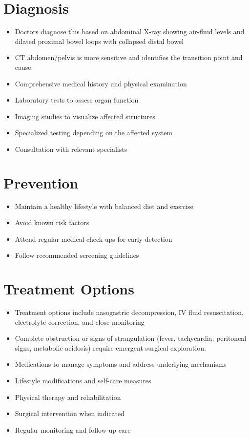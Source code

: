 \section{Diagnosis}
\begin{itemize}[noitemsep]
  \item Doctors diagnose this based on abdominal X-ray showing air-fluid levels and dilated proximal bowel loops with collapsed distal bowel
  \item CT abdomen/pelvis is more sensitive and identifies the transition point and cause.
  \item Comprehensive medical history and physical examination
  \item Laboratory tests to assess organ function
  \item Imaging studies to visualize affected structures
  \item Specialized testing depending on the affected system
  \item Consultation with relevant specialists
\end{itemize}
\section{Prevention}
\begin{itemize}[noitemsep]
  \item Maintain a healthy lifestyle with balanced diet and exercise
  \item Avoid known risk factors
  \item Attend regular medical check-ups for early detection
  \item Follow recommended screening guidelines
\end{itemize}
\section{Treatment Options}
\begin{itemize}[noitemsep]
  \item Treatment options include nasogastric decompression, IV fluid resuscitation, electrolyte correction, and close monitoring
  \item Complete obstruction or signs of strangulation (fever, tachycardia, peritoneal signs, metabolic acidosis) require emergent surgical exploration.
  \item Medications to manage symptoms and address underlying mechanisms
  \item Lifestyle modifications and self-care measures
  \item Physical therapy and rehabilitation
  \item Surgical intervention when indicated
  \item Regular monitoring and follow-up care
\end{itemize}
